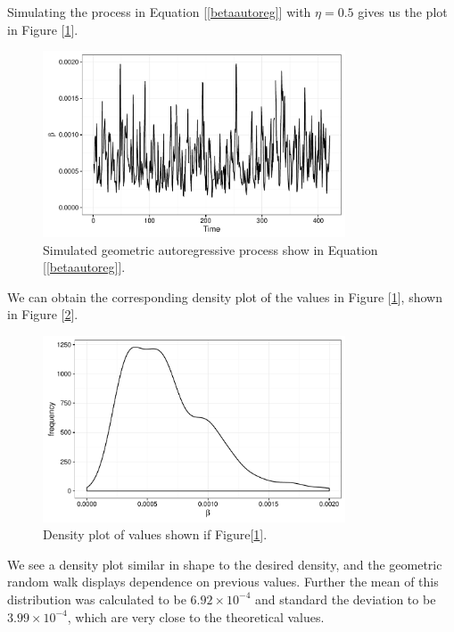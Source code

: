 	Simulating the process in Equation [\ref{betaautoreg}] with $\eta = 0.5$ gives us the plot in Figure [\ref{betaplot}].

	\begin{figure}
        \centering
        \captionsetup{width=.8\linewidth}
        \includegraphics[width=0.8\textwidth]{./images/betaplot.pdf}
        \caption{Simulated geometric autoregressive process show in Equation [\ref{betaautoreg}]. \label{betaplot}}
    \end{figure}

    We can obtain the corresponding density plot of the values in Figure [\ref{betaplot}], shown in Figure [\ref{betadensity}].

    \begin{figure}
        \centering
        \captionsetup{width=.8\linewidth}
        \includegraphics[width=0.8\textwidth]{./images/betadensity.pdf}
        \caption{Density plot of values shown if Figure[\ref{betaplot}]. \label{betadensity}}
    \end{figure}

    We see a density plot similar in shape to the desired density, and the geometric random walk displays dependence on previous values. Further the mean of this distribution was calculated to be $6.92 \times 10^{-4}$ and standard the deviation to be $3.99 \times 10^{-4}$, which are very close to the theoretical values.

